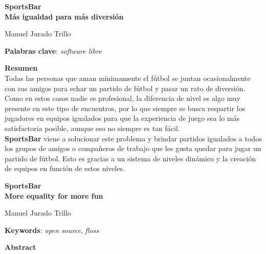 \thispagestyle{empty}

\begin{center}
{\large\bfseries SportsBar \\ Más igualdad para más diversión }\\
\end{center}
\begin{center}
Manuel Jurado Trillo\\
\end{center}


\vspace{0.5cm}
\noindent\textbf{Palabras clave}: \textit{software libre}
\vspace{0.7cm}

\noindent\textbf{Resumen}\\

Todas las personas que aman mínimamente el fútbol se juntan ocasionalmente con sus amigos para echar un partido de fútbol y pasar un rato de diversión.
Como en estos casos nadie es profesional, la diferencia de nivel es algo muy presente en este tipo de encuentros, por lo que siempre se busca respartir los jugadores en equipos igualados
para que la experiencia de juego sea lo más satisfactoria posible, aunque eso no siempre es tan fácil.\\

\textbf{SportsBar} viene a solucionar este problema y brindar partidos igualados a todos los grupos de amigos o compañeros de trabajo que les gusta quedar para jugar un partido de fútbol.
Esto es gracias a un sistema de niveles dinámico y la creación de equipos en función de estos niveles.

	

\cleardoublepage

\begin{center}
	{\large\bfseries SportsBar \\ More equality for more fun}\\
\end{center}
\begin{center}
	Manuel Jurado Trillo\\
\end{center}
\vspace{0.5cm}
\noindent\textbf{Keywords}: \textit{open source}, \textit{floss}
\vspace{0.7cm}

\noindent\textbf{Abstract}\\

